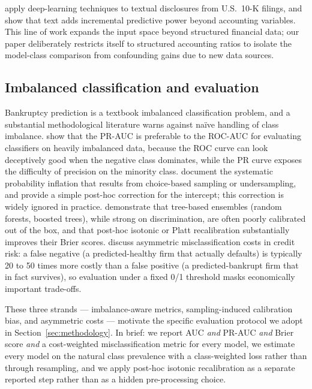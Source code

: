 \documentclass[11pt,a4paper]{article}
\begin{document}
\cite{mai2019} apply deep-learning techniques to textual disclosures from
U.S.\ 10-K filings, and show that text adds incremental predictive power
beyond accounting variables. This line of work expands the input space
beyond structured financial data; our paper deliberately restricts itself to
structured accounting ratios to isolate the model-class comparison from
confounding gains due to new data sources.

\subsection{Imbalanced classification and evaluation}

Bankruptcy prediction is a textbook imbalanced classification problem, and a
substantial methodological literature warns against naïve handling of class
imbalance. \cite{saito2015} show that the PR-AUC is preferable to the ROC-AUC
for evaluating classifiers on heavily imbalanced data, because the ROC curve
can look deceptively good when the negative class dominates, while the PR
curve exposes the difficulty of precision on the minority class.
\cite{king2001} document the systematic probability inflation that results
from choice-based sampling or undersampling, and provide a simple post-hoc
correction for the intercept; this correction is widely ignored in practice.
\cite{niculescu2005} demonstrate that tree-based ensembles (random forests,
boosted trees), while strong on discrimination, are often poorly calibrated
out of the box, and that post-hoc isotonic or Platt recalibration
substantially improves their Brier scores. \cite{altman2007} discuss
asymmetric misclassification costs in credit risk: a false negative (a
predicted-healthy firm that actually defaults) is typically 20 to 50 times
more costly than a false positive (a predicted-bankrupt firm that in fact
survives), so evaluation under a fixed 0/1 threshold masks economically
important trade-offs.

These three strands --- imbalance-aware metrics, sampling-induced calibration
bias, and asymmetric costs --- motivate the specific evaluation protocol we
adopt in Section~\ref{sec:methodology}. In brief: we report AUC \textit{and}
PR-AUC \textit{and} Brier score \textit{and} a cost-weighted misclassification
metric for every model, we estimate every model on the natural class
prevalence with a class-weighted loss rather than through resampling, and we
apply post-hoc isotonic recalibration as a separate reported step rather than
as a hidden pre-processing choice.
\end{document}
